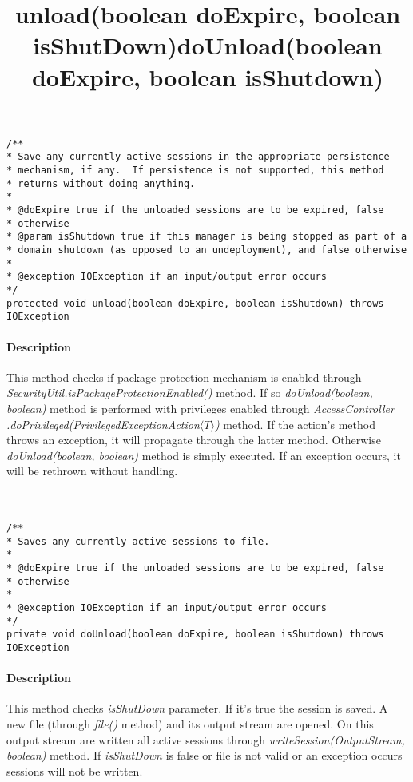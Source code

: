 \title{{\large \textbf{unload(boolean doExpire, boolean isShutDown)}}}
\lstset{firstnumber=626}
\begin{lstlisting}
/**
* Save any currently active sessions in the appropriate persistence
* mechanism, if any.  If persistence is not supported, this method
* returns without doing anything.
*
* @doExpire true if the unloaded sessions are to be expired, false
* otherwise
* @param isShutdown true if this manager is being stopped as part of a
* domain shutdown (as opposed to an undeployment), and false otherwise
*
* @exception IOException if an input/output error occurs
*/
protected void unload(boolean doExpire, boolean isShutdown) throws IOException
\end{lstlisting}
\paragraph{Description} This method checks if package protection mechanism is enabled through \textit{SecurityUtil.isPackageProtectionEnabled()} method. If so \textit{doUnload(boolean, boolean)} method is performed with privileges enabled through \textit{AccessController} \textit{.doPrivileged(PrivilegedExceptionAction$\langle T \rangle$)} method. If the action's method throws an exception, it will propagate through the latter method. Otherwise \textit{doUnload(boolean, boolean)} method is simply executed. If an exception occurs, it will be rethrown without handling.\\\\\\

\title{{\large \textbf{doUnload(boolean doExpire, boolean isShutdown)}}}
\lstset{firstnumber=657}
\begin{lstlisting}
/**
* Saves any currently active sessions to file.
*
* @doExpire true if the unloaded sessions are to be expired, false
* otherwise
*
* @exception IOException if an input/output error occurs
*/
private void doUnload(boolean doExpire, boolean isShutdown) throws IOException
\end{lstlisting}
\paragraph{Description} This method checks \textit{isShutDown} parameter. If it's true the session is saved. A new file (through \textit{file()} method) and its output stream are opened. On this output stream are written all active sessions through \textit{writeSession(OutputStream, boolean)} method. If \textit{isShutDown} is false or file is not valid or an exception occurs sessions will not be written.

